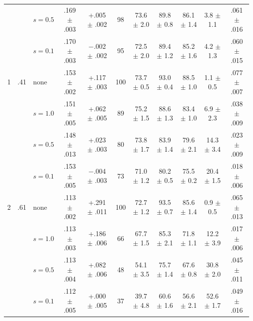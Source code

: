 \begin{table}[t]
\begin{tabular}{rrl cc c c cc c c}
 &  & $s=0.5$ & .169 $\pm$ .003 & +.005 $\pm$ .002 & 98 & 73.6 $\pm$ 2.0 & 89.8 $\pm$ 0.8 & 86.1 $\pm$ 1.4 & 3.8 $\pm$ 1.1 & .061 $\pm$ .016 \\
 &  & $s=0.1$ & .170 $\pm$ .003 & $-$.002 $\pm$ .002 & 95 & 72.5 $\pm$ 2.0 & 89.4 $\pm$ 1.2 & 85.2 $\pm$ 1.6 & 4.2 $\pm$ 1.3 & .060 $\pm$ .015 \\
\hline
1 & .41 & none & .153 $\pm$ .002 & +.117 $\pm$ .003 & 100 & 73.7 $\pm$ 0.5 & 93.0 $\pm$ 0.4 & 88.5 $\pm$ 1.0 & 1.1 $\pm$ 0.5 & .077 $\pm$ .007 \\
 &  & $s=1.0$ & .151 $\pm$ .005 & +.062 $\pm$ .005 & 89 & 75.2 $\pm$ 1.5 & 88.6 $\pm$ 1.3 & 83.4 $\pm$ 1.0 & 6.9 $\pm$ 2.3 & .038 $\pm$ .009 \\
 &  & $s=0.5$ & .148 $\pm$ .013 & +.023 $\pm$ .003 & 80 & 73.8 $\pm$ 1.7 & 83.9 $\pm$ 1.4 & 79.6 $\pm$ 2.1 & 14.3 $\pm$ 3.4 & .023 $\pm$ .009 \\
 &  & $s=0.1$ & .153 $\pm$ .005 & $-$.004 $\pm$ .003 & 73 & 71.0 $\pm$ 1.2 & 80.2 $\pm$ 0.5 & 75.5 $\pm$ 0.2 & 20.4 $\pm$ 1.5 & .018 $\pm$ .006 \\
\hline
2 & .61 & none & .113 $\pm$ .002 & +.291 $\pm$ .011 & 100 & 72.7 $\pm$ 1.2 & 93.5 $\pm$ 0.7 & 85.6 $\pm$ 1.4 & 0.9 $\pm$ 0.5 & .065 $\pm$ .013 \\
 &  & $s=1.0$ & .113 $\pm$ .003 & +.186 $\pm$ .006 & 66 & 67.7 $\pm$ 1.5 & 85.3 $\pm$ 2.1 & 71.8 $\pm$ 1.1 & 12.2 $\pm$ 3.9 & .017 $\pm$ .006 \\
 &  & $s=0.5$ & .113 $\pm$ .004 & +.082 $\pm$ .006 & 48 & 54.1 $\pm$ 3.5 & 75.7 $\pm$ 1.4 & 67.6 $\pm$ 0.8 & 30.8 $\pm$ 2.0 & .045 $\pm$ .011 \\
 &  & $s=0.1$ & .112 $\pm$ .005 & +.000 $\pm$ .005 & 37 & 39.7 $\pm$ 4.8 & 60.6 $\pm$ 1.6 & 56.6 $\pm$ 2.1 & 52.6 $\pm$ 1.7 & .049 $\pm$ .016 \\
\hline
\end{tabular}
\end{table}


